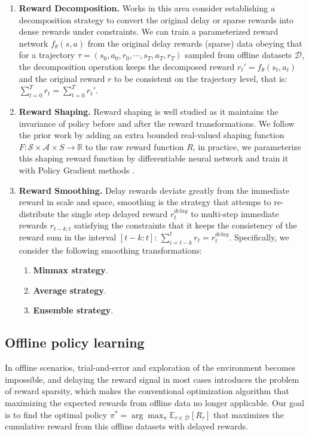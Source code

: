 \begin{enumerate}
    \item \textbf{Reward Decomposition.} Works in this area \cite{arjona-medinaRUDDERReturnDecomposition2019} consider establishing a decomposition strategy to convert the original delay or sparse rewards into dense rewards under constraints. We can train a parameterized reward network $f_{\theta}(s, a)$ from the original delay rewards (sparse) data obeying that for a trajectory $\tau = \left(s_0, a_0, r_0, \cdots,  s_T, a_T, r_T\right)$ sampled from offline datasets $\mathcal D$, the decomposition operation keeps the decomposed reward $r_t' = f_{\theta}(s_t, a_t)$ and the original reward $r$ to be consistent on the trajectory level, that is: $\sum_{t = 0}^T r_t = \sum_{t = 0}^T r_t'$.
    
    \item \textbf{Reward Shaping.} Reward shaping is well studied as it maintains the invariance of policy before and after the reward transformations. We follow the prior work \cite{ngPolicyInvarianceReward1999} by adding an extra bounded real-valued shaping function $F: \mathcal S \times \mathcal A \times S \rightarrow \mathbb R$ to the raw reward function $R$, in practice, we parameterize this shaping reward function by differentiable neural network and train it with Policy Gradient methods \cite{Peters:2010}.

    \item \textbf{Reward Smoothing.} Delay rewards deviate greatly from the immediate reward in scale and space, smoothing is the strategy that attemps to re-distribute the single step delayed reward $r_t^{delay}$ to multi-step immediate rewards $r_{t - k: t}$ satisfying the constraints that it keeps the consistency of the reward sum in the interval $[t - k: t]$: $\sum_{i = t-k}^t r_t = r_t^{delay}$. 
	Specifically, we consider the following smoothing transformations:
	\begin{enumerate}
		\item \textbf{Minmax strategy}.

		\item \textbf{Average strategy}.

		\item \textbf{Ensemble strategy}.

	\end{enumerate}
    
\end{enumerate}

\subsection{Offline policy learning}

In offline scenarios, trial-and-error and exploration of the environment becomes impossible, and delaying the reward signal in most cases introduces the problem of reward sparsity, which makes the conventional optimization algorithm that maximizing the expected rewards from offline data no longer applicable. Our goal is to find the optimal policy $\pi^{*} = \arg \max_{\pi} \mathbb E_{\tau \in \mathcal D} \left[ R_{\tau} \right]$ that maximizes the cumulative reward from this offline datasets with delayed rewards.


